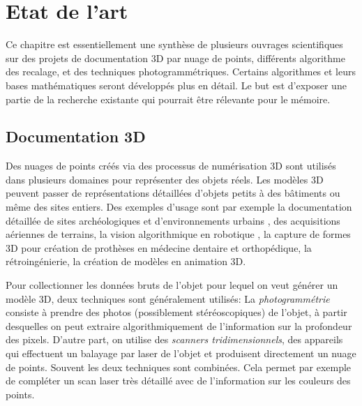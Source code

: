 \documentclass[a4paper,10pt]{scrreprt}
\begin{document}
\chapter{Etat de l'art}
Ce chapitre est essentiellement une synthèse de plusieurs ouvrages scientifiques sur des projets de documentation 3D par nuage de points, différents algorithme des recalage, et des techniques photogrammétriques. Certains algorithmes et leurs bases mathématiques seront développés plus en détail. Le but est d'exposer une partie de la recherche existante qui pourrait être rélevante pour le mémoire.


\section{Documentation 3D}
Des nuages de points créés via des processus de numérisation 3D sont utilisés dans plusieurs domaines pour représenter des objets réels. Les modèles 3D peuvent passer de représentations détaillées d'objets petits à des bâtiments ou même des sites entiers. Des exemples d'usage sont par exemple la documentation détaillée de sites archéologiques \cite{Web1} \cite{Kein2011} \cite{Grus2012} et d'environnements urbains \cite{Kers2006}, des acquisitions aériennes de terrains, la vision algorithmique en robotique \cite{Bibe2003}, la capture de formes 3D pour création de prothèses en médecine dentaire et orthopédique, la rétroingénierie, la création de modèles en animation 3D.

Pour collectionner les données bruts de l'objet pour lequel on veut générer un modèle 3D, deux techniques sont généralement utilisés: La \emph{photogrammétrie} consiste à prendre des photos (possiblement stéréoscopiques) de l'objet, à partir desquelles on peut extraire algorithmiquement de l'information sur la profondeur des pixels. D'autre part, on utilise des \emph{scanners tridimensionnels}, des appareils qui effectuent un balayage par laser de l'objet et produisent directement un nuage de points. Souvent les deux techniques sont combinées. Cela permet par exemple de compléter un scan laser très détaillé avec de l'information sur les couleurs des points.
\end{document}
